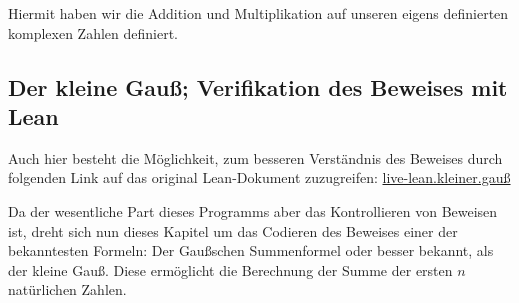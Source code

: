 \documentclass[10pt]{article}
\begin{document}







\noindent Hiermit haben wir die Addition und Multiplikation auf unseren eigens definierten komplexen Zahlen definiert. 

\subsection{Der \glqq kleine Gauß\grqq; Verifikation des Beweises mit Lean}
\noindent Auch hier besteht die Möglichkeit, zum besseren Verständnis des Beweises durch folgenden Link auf das
original Lean-Dokument zuzugreifen: \href{https://live.lean-lang.org/#code=import%20Mathlib.Data.Nat.Basic%0D%0Aimport%20Mathlib.Data.Real.Basic%0D%0A%0D%0Adef%20CC_sum_up_to%20(n%20%3A%20Nat)%3A%20%E2%84%95%20%3A%3D%0D%0A%20%20match%20n%20with%0D%0A%20%20%20%20%7C%200%20%3D%3E%200%0D%0A%20%20%20%20%7C%20(Nat.succ%20n)%20%3D%3E%20CC_sum_up_to%20n%20%2B%20Nat.succ%20n%0D%0A%0D%0A%23eval%20CC_sum_up_to%204%0D%0A%0D%0A%0D%0A%0D%0Atheorem%20CC_kleiner_gauss%20(n%3A%20Nat)%20%3A%0D%0A%20%20CC_sum_up_to%20n%20*%202%20%3D%20n%20*%20(n%20%2B%201)%20%3A%3D%20by%0D%0A%0D%0A%20%20induction%20n%20with%0D%0A%20%20%20%20%7C%20zero%20%3D%3E%0D%0A%20%20%20%20simp%0D%0A%20%20%20%20rw%20%5BCC_sum_up_to%5D%0D%0A%20%20%20%20%7C%20succ%20d%20hd%20%3D%3E%0D%0A%20%20%20%20rw%20%5BCC_sum_up_to%5D%0D%0A%20%20%20%20rw%20%5BNat.succ_eq_add_one%5D%0D%0A%20%20%20%20rw%20%5BNat.add_mul%5D%0D%0A%20%20%20%20rw%20%5BNat.mul_add%5D%0D%0A%20%20%20%20rw%20%5BNat.mul_one%5D%0D%0A%0D%0A%20%20%20%20rw%20%5BNat.add_mul%20d%201%20(d%20%2B%201)%5D%0D%0A%20%20%20%20simp%0D%0A%20%20%20%20rw%20%5Badd_assoc%5D%0D%0A%20%20%20%20rw%20%5B%E2%86%90%20Nat.mul_two%20(d%20%2B%201)%5D%0D%0A%20%20%20%20simp%0D%0A%20%20%20%20exact%20hd}{live-lean.kleiner.gauß}\par
\vspace{0.2cm} 
\noindent Da der wesentliche Part dieses Programms aber das Kontrollieren von Beweisen ist, dreht sich nun dieses Kapitel um das Codieren des Beweises einer der bekanntesten Formeln: Der Gaußschen Summenformel oder besser bekannt, als der \glqq kleine Gauß\grqq. Diese ermöglicht die Berechnung der Summe der ersten $n$ natürlichen Zahlen.
\end{document}
